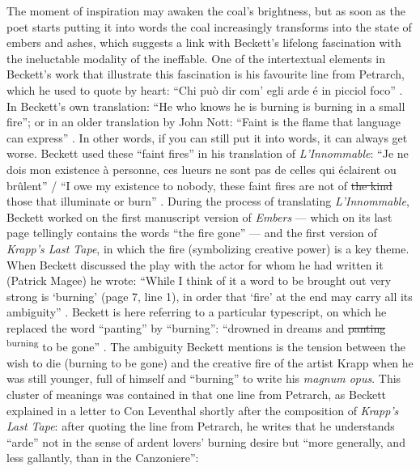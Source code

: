 \begin{paper}
\noindent The moment of inspiration may awaken the coal's brightness, but as soon
as the poet starts putting it into words the coal increasingly
transforms into the state of embers and ashes, which suggests a link
with Beckett's lifelong fascination with the ineluctable modality of the
ineffable. One of the intertextual elements in Beckett's work that
illustrate this fascination is his favourite line from Petrarch, which
he used to quote by heart: ``Chi può dir com' egli arde é in picciol
foco'' \citep[80]{atik_how_2001}. In Beckett's own translation: ``He who knows he
is burning is burning in a small fire''; or in an older translation by
John Nott: ``Faint is the flame that language can express'' \citep[80]{atik_how_2001}. In
other words, if you can still put it into words, it can always get
worse. Beckett used these ``faint fires'' in his translation of
\emph{L'Innommable}: ``Je ne dois mon existence à personne, ces lueurs
ne sont pas de celles qui éclairent ou brûlent'' \citep[13]{beckett_linnommable_1953} / ``I owe
my existence to nobody, these faint fires are not of \sout{the kind}
those that illuminate or burn'' . During the
process of translating \emph{L'Innommable}, Beckett worked on the first
manuscript version of \emph{Embers} --- which on its last page tellingly
contains the words ``the fire gone''  --- and the
first version of \emph{Krapp's Last Tape}, in which the fire
(symbolizing creative power) is a key theme. When Beckett discussed the
play with the actor for whom he had written it (Patrick Magee) he wrote:
``While I think of it a word to be brought out very strong is `burning'
(page 7, line 1), in order that `fire' at the end may carry all its
ambiguity'' \citep[129]{beckett_letters_2014}. Beckett is here referring to a
particular typescript, on which he replaced the word ``panting'' by
``burning'': ``drowned in dreams and \sout{panting}
\textsuperscript{burning} to be gone'' . The
ambiguity Beckett mentions is the tension between the wish to die
(burning to be gone) and the creative fire of the artist Krapp when he
was still younger, full of himself and ``burning'' to write his
\emph{magnum opus}. This cluster of meanings was contained in that one
line from Petrarch, as Beckett explained in a letter to Con Leventhal
shortly after the composition of \emph{Krapp's Last Tape}: after quoting
the line from Petrarch, he writes that he understands ``arde'' not in
the sense of ardent lovers' burning desire but ``more generally, and
less gallantly, than in the Canzoniere'':


\end{paper}
